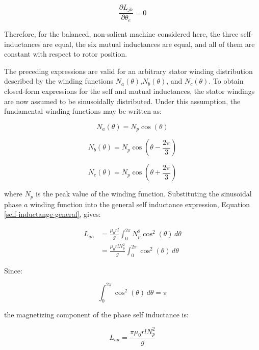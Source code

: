 \documentclass{article}
\begin{document}
\begin{equation}
    \frac{\partial L_{jk}}{\partial \theta_e} = 0
\end{equation}

Therefore, for the balanced, non-salient machine considered here, the three self-inductances are equal, the six mutual inductances are equal, and all of them are constant with respect to rotor position.

The preceding expressions are valid for an arbitrary stator winding distribution described by the winding functions $N_a(\theta)$,$N_b(\theta)$, and $N_c(\theta)$. To obtain closed-form expressions for the self and mutual inductances, the stator windings are now assumed to be sinusoidally distributed. Under this assumption, the fundamental
winding functions may be written as:

\begin{equation}
    N_a(\theta) = N_p \cos(\theta)
\end{equation}

\begin{equation}
    N_b(\theta) = N_p \cos\left(\theta-\frac{2\pi}{3}\right)
\end{equation}

\begin{equation}
    N_c(\theta) = N_p \cos\left(\theta+\frac{2\pi}{3}\right)
\end{equation}

where $N_p$ is the peak value of the winding function. Substituting the sinusoidal phase $a$ winding function into the general
self inductance expression, Equation \ref{self-inductange-general}, gives:

\begin{align}
    L_{aa} &= \frac{\mu_0 r l}{g} \int_0^{2\pi} N_p^2 \cos^2(\theta)\,d\theta \\[10pt]
    &= \frac{\mu_0 r l N_p^2}{g} \int_0^{2\pi} \cos^2(\theta)\,d\theta
\end{align}

Since:

\begin{equation}
    \int_0^{2\pi}\cos^2(\theta)\,d\theta = \pi
\end{equation}

the magnetizing component of the phase self inductance is:

\begin{equation}
\label{self-inductance-distributed}
    L_{aa} = \frac{\pi \mu_0 r l N_p^2}{g}
\end{equation}
\end{document}
